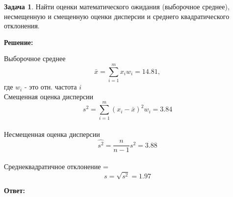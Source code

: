 \documentclass[a4paper,12pt]{article}
\theoremstyle{definition}
\newtheorem{problem}{Задача}\setlength{\parindent}{0pt}
\newenvironment{solution}
{\begin{shaded}\textbf{Решение:}\par\setlength{\parindent}{0pt}}
{\end{shaded}}
\newenvironment{answer}
{\par\noindent\textbf{Ответ:} }
{\par}
\begin{document}
\vspace{8pt}
\begin{problem}
    Найти оценки математического ожидания (выборочное среднее), несмещенную и
    смещенную оценки дисперсии и среднего квадратического отклонения.
    
        \begin{solution}
            Выборочное среднее 
            \[ \bar{x} = \sum^m_{i=1} x_i w_i = 14.81,\] 
            где \(w_i\) - это отн. частота \(i\) \\

            Смещенная оценка дисперсии 
            \[ s^2 = \sum^m_{i=1}(x_i - \bar{x})^2 w_i = 3.84 \] \\

            Несмещенная оценка дисперсии 
            \[ \hat{s^2} = \frac{n}{n-1} s^2 = 3.88 \] \\

            Среднеквадратичное отклонение = \[ s = \sqrt{s^2} = 1.97 \]
        \end{solution}
    
        \begin{answer}
        \end{answer}
    
    \end{problem}
\end{document}
